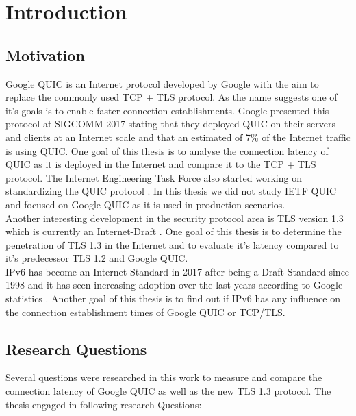 \chapter{Introduction}\label{chapter:introduction}

\section{Motivation}
Google QUIC is an Internet protocol developed by Google with the aim to replace the commonly used TCP + TLS protocol.
As the name suggests one of it's goals is to enable faster connection establishments.
Google presented this protocol at SIGCOMM 2017 \cite{DBLP:conf/sigcomm/LangleyRWVKZYKS17} stating that they deployed QUIC on their servers and clients at an Internet scale and that an estimated of 7\% of the Internet traffic is using QUIC.
One goal of this thesis is to analyse the connection latency of QUIC as it is deployed in the Internet and compare it to the TCP + TLS protocol.
The Internet Engineering Task Force also started working on standardizing the QUIC protocol \cite{Link:ietfQuic}.
In this thesis we did not study IETF QUIC and focused on Google QUIC as it is used in production scenarios.\\
Another interesting development in the security protocol area is TLS version 1.3 which is currently an Internet-Draft \cite{ietf-tls-tls13-28}.
One goal of this thesis is to determine the penetration of TLS 1.3 in the Internet and to evaluate it's latency compared to it's predecessor TLS 1.2 and Google QUIC.\\
IPv6 has become an Internet Standard in 2017 \cite{Link:IPv6Internet} after being a Draft Standard since 1998 \cite{Link:IPv6Draft} and it has seen increasing adoption over the last years according to Google statistics \cite{Link:IPv6Adoption}.
Another goal of this thesis is to find out if IPv6 has any influence on the connection establishment times of Google QUIC or TCP/TLS.

\newpage

\section{Research Questions}

Several questions were researched in this work to measure and compare the connection latency of Google QUIC
as well as the new TLS 1.3 protocol.
The thesis engaged in following research Questions:

